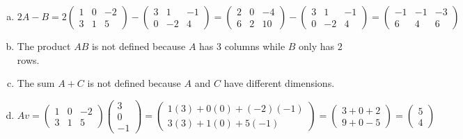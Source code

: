 \documentclass[11pt,letterpaper]{article}
\begin{document}
\begin{enumerate}[(a)]
\item 
	\[
	2A - B= 2 \begin{pmatrix} 1 & 0 & -2 \\ 3 & 1 & 5 \end{pmatrix} - \begin{pmatrix} 3 & 1 & -1 \\ 0 & -2 & 4 \end{pmatrix}= \begin{pmatrix} 2 & 0 & -4 \\ 6 & 2 & 10 \end{pmatrix} - \begin{pmatrix} 3 & 1 & -1 \\ 0 & -2 & 4 \end{pmatrix}= \begin{pmatrix} -1 & -1 & -3 \\ 6 & 4 & 6 \end{pmatrix}
	\] \pspace
	
\item The product $AB$ is not defined because $A$ has $3$ columns while $B$ only has $2$ rows. \pspace

\item The sum $A + C$ is not defined because $A$ and $C$ have different dimensions. \pspace

\item 
	\[
	Av= \begin{pmatrix} 1 & 0 & -2 \\ 3 & 1 & 5 \end{pmatrix} \begin{pmatrix} 3 \\ 0 \\ -1 \end{pmatrix}= \begin{pmatrix} 1(3) + 0(0) + (-2)(-1) \\ 3(3) + 1(0) + 5(-1) \end{pmatrix}= \begin{pmatrix} 3 + 0 + 2 \\ 9 + 0 - 5 \end{pmatrix}= \begin{pmatrix} 5 \\ 4 \end{pmatrix}
	\] \pspace


\end{enumerate}
\end{document}
